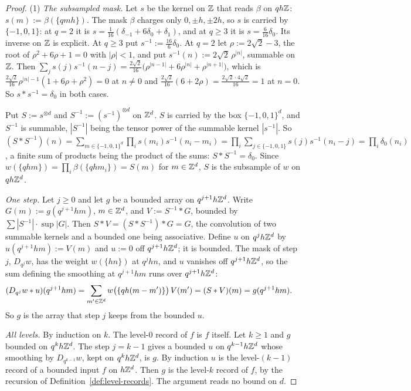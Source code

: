 \begin{proof}
(1) \emph{The subsampled mask.} Let $s$ be the kernel on $\mathbb{Z}$ that reads $\beta$ on $qh\mathbb{Z}$:
$s(m) := \beta(\{qmh\})$. The mask $\beta$ charges only $0, \pm h, \pm 2h$, so $s$ is carried by
$\{-1, 0, 1\}$: at $q = 2$ it is $s = \tfrac{1}{16}(\delta_{-1} + 6\delta_0 + \delta_1)$, and at
$q \ge 3$ it is $s = \tfrac{6}{16}\delta_0$. Its inverse on $\mathbb{Z}$ is explicit. At $q \ge 3$ put
$s^{-1} := \tfrac{16}{6}\delta_0$. At $q = 2$ let $\rho := 2\sqrt2 - 3$, the root of
$\rho^2 + 6\rho + 1 = 0$ with $|\rho| < 1$, and put $s^{-1}(n) := 2\sqrt2\,\rho^{|n|}$, summable on
$\mathbb{Z}$. Then $\sum_j s(j)s^{-1}(n - j) = \tfrac{2\sqrt2}{16}\bigl(\rho^{|n-1|} + 6\rho^{|n|} +
\rho^{|n+1|}\bigr)$, which is $\tfrac{2\sqrt2}{16}\rho^{|n|-1}(1 + 6\rho + \rho^2) = 0$ at $n \ne 0$
and $\tfrac{2\sqrt2}{16}(6 + 2\rho) = \tfrac{2\sqrt2 \cdot 4\sqrt2}{16} = 1$ at $n = 0$. So
$s * s^{-1} = \delta_0$ in both cases.

Put $S := s^{\otimes d}$ and $S^{-1} := (s^{-1})^{\otimes d}$ on $\mathbb{Z}^d$. $S$ is carried by the box
$\{-1, 0, 1\}^d$, and $S^{-1}$ is summable, $|S^{-1}|$ being the tensor power of the summable
kernel $|s^{-1}|$. So $(S * S^{-1})(n) = \sum_{m \in \{-1,0,1\}^d}\prod_i s(m_i)s^{-1}(n_i - m_i) =
\prod_i\sum_{j \in \{-1,0,1\}}s(j)s^{-1}(n_i - j) = \prod_i\delta_0(n_i)$, a finite sum of products
being the product of the sums: $S * S^{-1} = \delta_0$. Since $w(\{qhm\}) = \prod_i\beta(\{qhm_i\})
= S(m)$ for $m \in \mathbb{Z}^d$, $S$ is the subsample of $w$ on $qh\mathbb{Z}^d$.

\emph{One step.} Let $j \ge 0$ and let $g$ be a bounded array on $q^{j+1}h\mathbb{Z}^d$. Write
$G(m) := g(q^{j+1}hm)$, $m \in \mathbb{Z}^d$, and $V := S^{-1} * G$, bounded by
$\sum|S^{-1}|\cdot\sup|G|$. Then $S * V = (S * S^{-1}) * G = G$, the convolution of two summable
kernels and a bounded one being associative. Define $u$ on $q^jh\mathbb{Z}^d$ by $u(q^{j+1}hm) := V(m)$ and
$u := 0$ off $q^{j+1}h\mathbb{Z}^d$; it is bounded. The mask of step $j$, $D_{q^j}w$, has the weight
$w(\{hn\})$ at $q^jhn$, and $u$ vanishes off $q^{j+1}h\mathbb{Z}^d$, so the sum defining the smoothing at
$q^{j+1}hm$ runs over $q^{j+1}h\mathbb{Z}^d$:
\begin{align*}
(D_{q^j}w * u)(q^{j+1}hm) &= \sum_{m' \in \mathbb{Z}^d}w\bigl(\{qh(m - m')\}\bigr)\,V(m') = (S * V)(m)
= g(q^{j+1}hm).
\end{align*}
So $g$ is the array that step $j$ keeps from the bounded $u$.

\emph{All levels.} By induction on $k$. The level-$0$ record of $f$ is $f$ itself. Let $k \ge 1$
and $g$ bounded on $q^kh\mathbb{Z}^d$. The step $j = k-1$ gives a bounded $u$ on $q^{k-1}h\mathbb{Z}^d$ whose
smoothing by $D_{q^{k-1}}w$, kept on $q^kh\mathbb{Z}^d$, is $g$. By induction $u$ is the level-$(k-1)$
record of a bounded input $f$ on $h\mathbb{Z}^d$. Then $g$ is the level-$k$ record of $f$, by the
recursion of Definition~\ref{def:level-records}. The argument reads no bound on $d$.


\end{proof}
